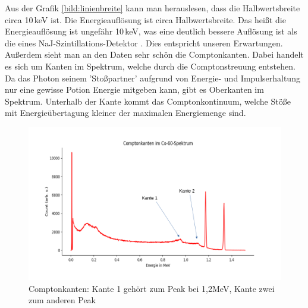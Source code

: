 Aus der Grafik \ref{bild:linienbreite} kann man herauslesen, dass die Halbwertsbreite circa 10\,keV ist. Die Energieauflösung ist circa Halbwertsbreite. Das heißt 
die Energieauflösung ist ungefähr 10\,keV, was eine deutlich bessere Auflösung ist als die eines NaJ-Szintillations-Detektor \cite[S.9]{Kador2021}. Dies entspricht unseren Erwartungen.\\
 

Außerdem sieht man an den Daten sehr schön die Comptonkanten. Dabei handelt es sich um Kanten im Spektrum, welche durch die Comptonstreuung entstehen. 
Da das Photon seinem 'Stoßpartner' aufgrund von Energie- und Impulserhaltung nur eine gewisse Potion Energie mitgeben kann, gibt es Oberkanten im 
Spektrum. Unterhalb der Kante kommt das Comptonkontinuum, welche Stöße mit Energieübertagung kleiner der maximalen Energiemenge sind.


\begin{figure}[ht]
    \centering
    \includegraphics[width = \linewidth]{Bilder/Auswertung/Comtonkante.png}
    \caption{Comptonkanten: Kante 1 gehört zum Peak bei 1,2MeV, Kante zwei zum anderen Peak}
\end{figure}

\clearpage
